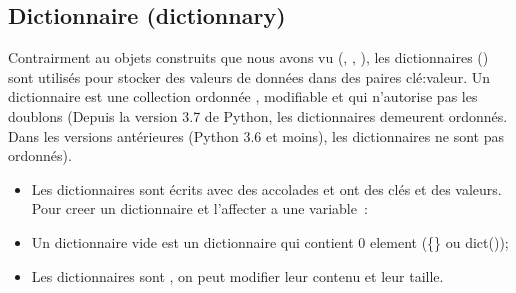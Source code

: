 \documentclass[letterpaper,10pt,french]{sphinxmanual}
\begin{document}
\subsection{Dictionnaire (dictionnary)}
\label{\detokenize{ch5:dictionnaire-dictionnary}}
\sphinxAtStartPar
Contrairment au objets construits que nous avons vu (, , ), les dictionnaires () sont utilisés pour stocker des valeurs de données dans des paires clé:valeur. Un dictionnaire est une collection ordonnée , modifiable et qui n’autorise pas les doublons (Depuis la version 3.7 de Python, les dictionnaires demeurent ordonnés. Dans les versions antérieures (Python 3.6 et moins), les dictionnaires ne sont pas ordonnés).
\begin{itemize}
\item {} 
\sphinxAtStartPar
Les dictionnaires sont écrits avec des accolades et ont des clés et des valeurs.  Pour creer un dictionnaire et l’affecter a une variable :

\end{itemize}

\begin{sphinxVerbatim}[commandchars=\\\{\}]
     
\end{sphinxVerbatim}
\begin{itemize}
\item {} 
\sphinxAtStartPar
Un dictionnaire vide est un dictionnaire qui contient 0 element (\{\} ou dict());

\item {} 
\sphinxAtStartPar
Les dictionnaires sont , on peut modifier leur contenu et leur taille.

\end{itemize}
\end{document}
